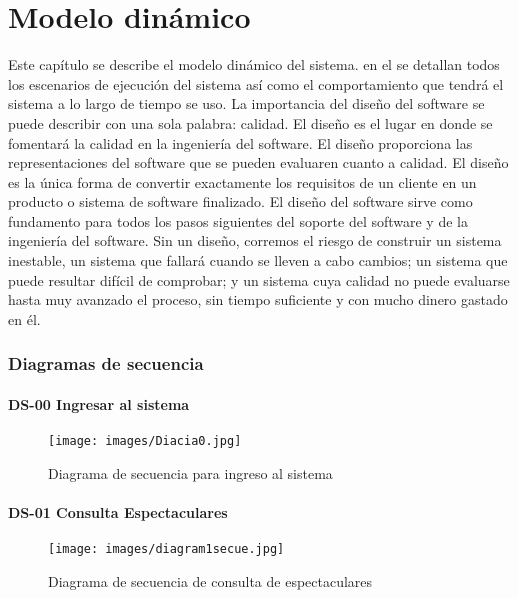 \chapter{Modelo dinámico}
\label{cap:ModeloDinamico}

Este capítulo se describe el modelo dinámico del sistema. en el se detallan todos los escenarios de ejecución del sistema así como el comportamiento que tendrá el sistema a lo largo de tiempo se uso.
La importancia del diseño del software se puede describir con una sola palabra: calidad. El diseño es el lugar en donde se fomentará la calidad en la ingeniería del software. El diseño proporciona las representaciones del software que se pueden evaluaren cuanto a calidad. El diseño es la única forma de convertir exactamente los requisitos de un cliente en un producto o sistema de software finalizado. El diseño del software sirve como fundamento para todos los pasos siguientes del soporte del software y de la ingeniería del software.
Sin un diseño, corremos el riesgo de construir un sistema inestable, un sistema que fallará cuando se lleven a cabo cambios; un sistema que puede resultar difícil de comprobar; y un sistema cuya calidad no puede evaluarse hasta muy avanzado el proceso, sin tiempo suficiente y con mucho dinero gastado en él.

\subsection{Diagramas de secuencia}
\subsubsection{DS-00 Ingresar al sistema}
\begin{figure}[htbp!]
    \centering
    \texttt{[image: images/Diacia0.jpg]}
    \caption{Diagrama de secuencia para ingreso al sistema}
    \label{fig:my_label}
\end{figure}
\clearpage

\subsubsection{DS-01 Consulta Espectaculares}
\begin{figure}[htbp!]
    \centering
    \texttt{[image: images/diagram1secue.jpg]}
    \caption{Diagrama de secuencia de consulta de espectaculares}
    \label{fig:my_label}
\end{figure}
\clearpage


